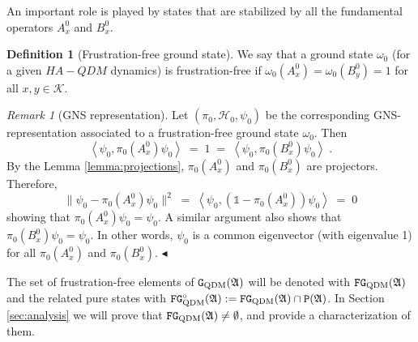 \documentclass[a4paper,12pt,twoside,reqno]{amsart}
\theoremstyle{plain}
\theoremstyle{definition}
\newtheorem{definition}[teo]{Definition}
\theoremstyle{remark}
\newtheorem{remark}[teo]{Remark}
\numberwithin{equation}{section}
\numberwithin{figure}{section}
\numberwithin{table}{section}
\newcommand\inner[2]{\left\langle #1, #2 \right\rangle}
\newcommand{\f}[1]{\mathcal{#1}}
\newcommand{\n}[1]{\mathbb{#1}}
\begin{document}
	
	
	
	
	\medskip
	
	
	
	
	
	
	An important role is played by states that are stabilized by all the fundamental operators $A_x^0$   and $B_x^0$. 
	
	
	
	
	
	
	\begin{definition}[Frustration-free ground state]\label{def:ffgs}
		We say that a ground state $\omega_0$ (for a given $HA-QDM$ dynamics) is frustration-free if $\omega_0(A_x^0)=\omega_0(B_y^0)=1$ for all $x,y\in\f{K}$.
	\end{definition}
	
	
	
	
	
	
	
	
	\begin{remark}[GNS representation]
		Let $(\pi_0,\mathcal{H}_0,\psi_0)$ be the corresponding GNS-representation associated to a frustration-free ground state
		$\omega_0$.
		Then 
		$$\inner{\psi_0}{\pi_0(A_x^0)\psi_0}\;=\;1\;=\;\inner{\psi_0}{\pi_0(B_x^0)\psi_0}\;.$$ 
		By the Lemma \ref{lemma:projections}, $\pi_0(A_x^0)$ and $\pi_0(B_x^0)$ are projectors. Therefore, 
		\[
		\|\psi_0-\pi_0(A_x^0)\psi_0\|^2\;=\;\inner{\psi_0}{(\n{1}-\pi_0(A_x^0))\psi_0}\;=\;0
		\]
		showing that $\pi_0(A_x^0)\psi_0=\psi_0$. A similar argument also shows that $\pi_0(B_x^0)\psi_0=\psi_0$. In other words, $\psi_0$ is a common eigenvector (with eigenvalue 1) for all $\pi_0(A_x^0)$ and  $\pi_0(B_x^0)$.
		\hfill $\blacktriangleleft$
	\end{remark}
	
	
	
	
	\medskip
	
	
	
	
	
	
	The set of frustration-free elements of $\mathtt{G}_{\rm QDM}(\mathfrak{A})$ will be denoted with $\mathtt{FG}_{\rm QDM}(\mathfrak{A})$ and the related pure states with $\mathtt{FG}_{\rm QDM}^{{\circ}}(\mathfrak{A}):=\mathtt{FG}_{\rm QDM}(\mathfrak{A})\cap\mathtt{P}(\mathfrak{A})$.
	In Section \ref{sec:analysis} we will prove that $\mathtt{FG}_{\rm QDM}(\mathfrak{A})\neq \emptyset$, and provide a characterization of them.
	
	
	
	
	
	
	
\end{document}
